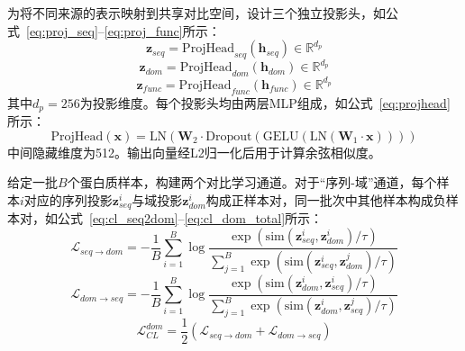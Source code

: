 为将不同来源的表示映射到共享对比空间，设计三个独立投影头，如公式~\eqref{eq:proj_seq}--\eqref{eq:proj_func}所示：
\begin{equation}
\label{eq:proj_seq}
    \mathbf{z}_{seq} = \text{ProjHead}_{seq}(\mathbf{h}_{seq}) \in \mathbb{R}^{d_p}
\end{equation}
\begin{equation}
\label{eq:proj_dom}
    \mathbf{z}_{dom} = \text{ProjHead}_{dom}(\mathbf{h}_{dom}) \in \mathbb{R}^{d_p}
\end{equation}
\begin{equation}
\label{eq:proj_func}
    \mathbf{z}_{func} = \text{ProjHead}_{func}(\mathbf{h}_{func}) \in \mathbb{R}^{d_p}
\end{equation}
其中$d_p=256$为投影维度。每个投影头均由两层MLP组成，如公式~\eqref{eq:projhead}所示：
\begin{equation}
\label{eq:projhead}
    \text{ProjHead}(\mathbf{x}) = \text{LN}\!\left(\mathbf{W}_2 \cdot \text{Dropout}\!\left(\text{GELU}\!\left(\text{LN}(\mathbf{W}_1 \cdot \mathbf{x})\right)\right)\right)
\end{equation}
中间隐藏维度为512。输出向量经L2归一化后用于计算余弦相似度。

给定一批$B$个蛋白质样本，构建两个对比学习通道。对于“序列-域”通道，每个样本$i$对应的序列投影$\mathbf{z}_{seq}^i$与域投影$\mathbf{z}_{dom}^i$构成正样本对，同一批次中其他样本构成负样本对，如公式~\eqref{eq:cl_seq2dom}--\eqref{eq:cl_dom_total}所示：
\begin{equation}
\label{eq:cl_seq2dom}
    \mathcal{L}_{seq \to dom} = -\frac{1}{B}\sum_{i=1}^{B}
    \log
    \frac{\exp(\text{sim}(\mathbf{z}_{seq}^i,\mathbf{z}_{dom}^i)/\tau)}
    {\sum_{j=1}^{B}\exp(\text{sim}(\mathbf{z}_{seq}^i,\mathbf{z}_{dom}^j)/\tau)}
\end{equation}
\begin{equation}
\label{eq:cl_dom2seq}
    \mathcal{L}_{dom \to seq} = -\frac{1}{B}\sum_{i=1}^{B}
    \log
    \frac{\exp(\text{sim}(\mathbf{z}_{dom}^i,\mathbf{z}_{seq}^i)/\tau)}
    {\sum_{j=1}^{B}\exp(\text{sim}(\mathbf{z}_{dom}^i,\mathbf{z}_{seq}^j)/\tau)}
\end{equation}
\begin{equation}
\label{eq:cl_dom_total}
    \mathcal{L}_{CL}^{dom} = \frac{1}{2}\left(\mathcal{L}_{seq \to dom} + \mathcal{L}_{dom \to seq}\right)
\end{equation}


